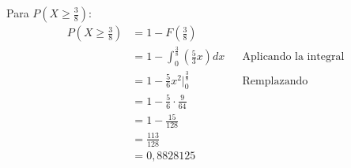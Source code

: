 \documentclass{templateNote}
\begin{document}
Para $\displaystyle P\left(X \geq \frac{3}{8}\right)$:
\begin{align*}
    \displaystyle P\left(X \geq \frac{3}{8}\right) &= 1 - F(\frac{3}{8})\\
    &= 1 - \int_{0}^{\frac{3}{8}}{(\frac{5}{3}x)dx} && \text{Aplicando la integral} \\
    &= 1 - \frac{5}{6}x^2 \Big|_{0}^{\frac{3}{8}} && \text{Remplazando} \\
    &= 1 - \frac{5}{6} \cdot \frac{9}{64} \\
    &= 1 - \frac{15}{128} \\
    &= \frac{113}{128} \\
    &= 0,8828125
\end{align*}
\end{document}
